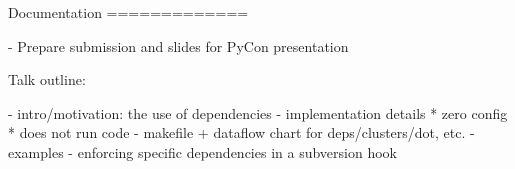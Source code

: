 

Documentation
=============

- Prepare submission and slides for PyCon presentation

  Talk outline:

  - intro/motivation: the use of dependencies
  - implementation details
    * zero config
    * does not run code
  - makefile + dataflow chart for deps/clusters/dot, etc.
  - examples
  - enforcing specific dependencies in a subversion hook



